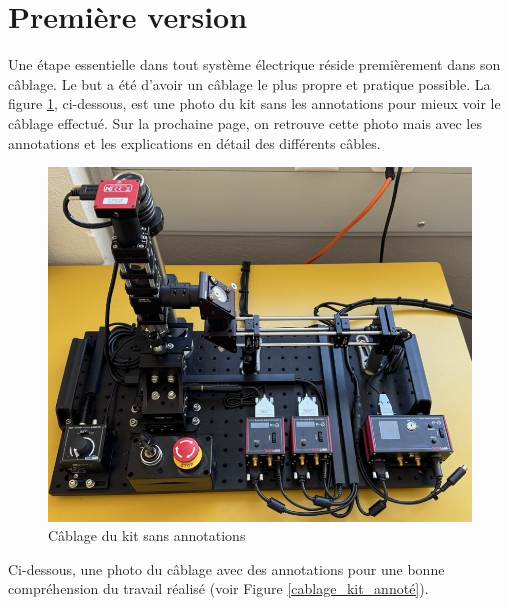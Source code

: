 \section{Première version}
Une étape essentielle dans tout système électrique réside premièrement dans son câblage. Le but a été d'avoir un câblage le plus propre et pratique possible.
La figure \ref{cablage_kit_pas_annoté}, ci-dessous, est une photo du kit sans les annotations pour mieux voir le câblage effectué. Sur la prochaine page, on retrouve cette photo mais avec les annotations et les explications en détail des différents câbles.
\begin{figure}[H]
    \begin{center}
        \includegraphics[width=\textwidth]{assets/figures/Cablage_du_kit/Cablage_vierge.jpeg}
    \end{center}
    \caption{Câblage du kit sans annotations}
    \label{cablage_kit_pas_annoté}
\end{figure}

\newpage
Ci-dessous, une photo du câblage avec des annotations pour une bonne compréhension du travail réalisé (voir Figure \ref{cablage_kit_annoté}).


